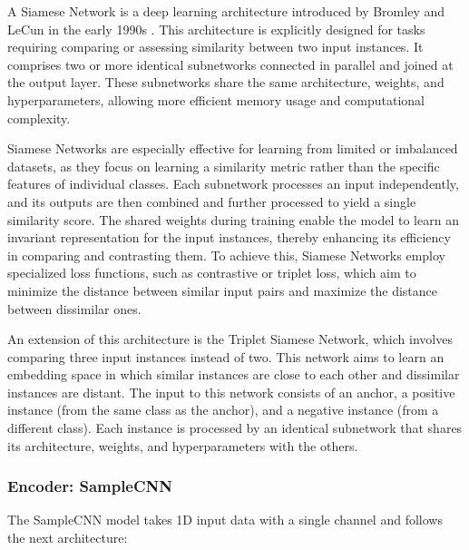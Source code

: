 A Siamese Network is a deep learning architecture introduced by Bromley and LeCun in the early 1990s \cite{Bromley1993SignatureNetwork}. This architecture is explicitly designed for tasks requiring comparing or assessing similarity between two input instances. It comprises two or more identical subnetworks connected in parallel and joined at the output layer. These subnetworks share the same architecture, weights, and hyperparameters, allowing more efficient memory usage and computational complexity.

Siamese Networks are especially effective for learning from limited or imbalanced datasets, as they focus on learning a similarity metric rather than the specific features of individual classes. Each subnetwork processes an input independently, and its outputs are then combined and further processed to yield a single similarity score. The shared weights during training enable the model to learn an invariant representation for the input instances, thereby enhancing its efficiency in comparing and contrasting them. To achieve this, Siamese Networks employ specialized loss functions, such as contrastive or triplet loss, which aim to minimize the distance between similar input pairs and maximize the distance between dissimilar ones.

An extension of this architecture is the Triplet Siamese Network, which involves comparing three input instances instead of two. This network aims to learn an embedding space in which similar instances are close to each other and dissimilar instances are distant. The input to this network consists of an anchor, a positive instance (from the same class as the anchor), and a negative instance (from a different class). Each instance is processed by an identical subnetwork that shares its architecture, weights, and hyperparameters with the others.

\subsubsection{Encoder: SampleCNN}

The SampleCNN model \cite{Lee2018SampleCNN:Classification} takes 1D input data with a single channel and follows the next architecture:


